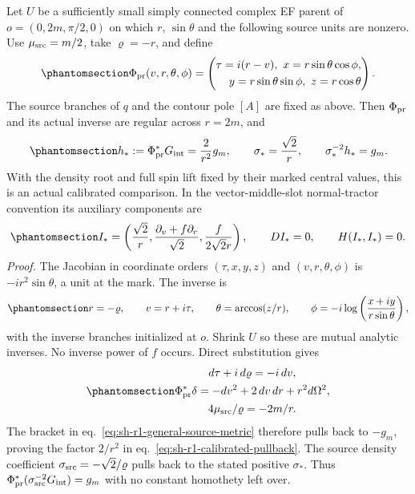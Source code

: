 \documentclass[
  english,
  11pt,
  reqno]{amsart}
\begin{document}
Let \(U\) be a sufficiently small simply connected complex EF parent of
\(o=(0,2m,\pi/2,0)\) on which \(r\), \(\sin\theta\) and the following
source units are nonzero. Use \(\mu_{\rm src}=m/2\), take
\(\varrho=-r\), and define
\begin{equation}\protect\phantomsection\label{eq:sh-r1-horizon-map}{
 \Phi_{\rm pr}(v,r,\theta,\phi)=
 \left(\begin{aligned}\tau=i(r-v),\ x=r\sin\theta\cos\phi,\\
       \ y=r\sin\theta\sin\phi,\ z=r\cos\theta\end{aligned}\right).
}\end{equation} The source branches of \(q\) and the contour pole
\([A]\) are fixed as above. Then \(\Phi_{\rm pr}\) and its actual
inverse are regular across \(r=2m\), and
\begin{equation}\protect\phantomsection\label{eq:sh-r1-calibrated-pullback}{
 h_*:=\Phi_{\rm pr}^*G_{\rm int}=\frac2{r^2}g_m,\qquad
 \sigma_*=\frac{\sqrt2}{r},\qquad \sigma_*^{-2}h_*=g_m.
}\end{equation} With the density root and full spin lift fixed by their
marked central values, this is an actual calibrated comparison. In the
vector-middle-slot normal-tractor convention its auxiliary components
are
\begin{equation}\protect\phantomsection\label{eq:sh-r1-vector-tractor}{
 I_*=
 \left(\frac{\sqrt2}{r},\frac{\partial_v+f\partial_r}{\sqrt2},
                         \frac f{2\sqrt2r}\right),\qquad
 DI_*=0,\qquad H(I_*,I_*)=0.
}\end{equation} \emph{Proof.} The Jacobian in coordinate orders
\((\tau,x,y,z)\) and \((v,r,\theta,\phi)\) is \(-ir^2\sin\theta\), a
unit at the mark. The inverse is
\begin{equation}\protect\phantomsection\label{eq:sh-r1-horizon-inverse}{
 r=-\varrho,\qquad v=r+i\tau,\qquad
 \theta=\arccos(z/r),\qquad
 \phi=-i\log\left(\frac{x+iy}{r\sin\theta}\right),
}\end{equation} with the inverse branches initialized at \(o\). Shrink
\(U\) so these are mutual analytic inverses. No inverse power of \(f\)
occurs. Direct substitution gives
\begin{equation}\protect\phantomsection\label{eq:sh-r1-pullback-identities}{\begin{gathered}
d\tau+i\,d\varrho=-i\,dv, \\
\Phi_{\rm pr}^*\delta=-dv^2+2\,dv\,dr+r^2d\Omega^2, \\
4\mu_{\rm src}/\varrho=-2m/r.
\end{gathered}}\end{equation} The bracket in eq.~\ref{eq:sh-r1-general-source-metric}
therefore pulls back to \(-g_m\), proving the factor \(2/r^2\) in
eq.~\ref{eq:sh-r1-calibrated-pullback}. The source density coefficient
\(\sigma_{\rm src}=-\sqrt2/\varrho\) pulls back to the stated positive
\(\sigma_*\). Thus
\(\Phi_{\rm pr}^*(\sigma_{\rm src}^{-2}G_{\rm int})=g_m\) with no
constant homothety left over.
\end{document}
